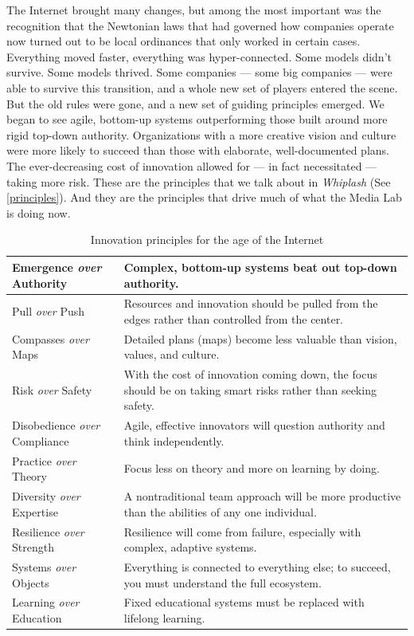 The Internet brought many changes, but among the most important was the recognition that the Newtonian laws that had governed how companies operate now turned out to be local ordinances that only worked in certain cases. Everything moved faster, everything was hyper-connected. Some models didn't survive. Some models thrived. Some companies --- some big companies --- were able to survive this transition, and a whole new set of players entered the scene. But the old rules were gone, and a new set of guiding principles emerged. We began to see agile, bottom-up systems outperforming those built around more rigid top-down authority. Organizations with a more creative vision and culture were more likely to succeed than those with elaborate, well-documented plans. The ever-decreasing cost of innovation allowed for --- in fact necessitated --- taking more risk. These are the principles that we talk about in \emph{Whiplash} (See \autoref{principles}). And they are the principles that drive much of what the Media Lab is doing now.

\begin{table}[H]
\centering
\caption{Innovation principles for the age of the Internet}
\label{principles}
\begin{tabular}{| L{3cm} | L{7cm} |}
\hline
Emergence \textit{over} Authority & Complex, bottom-up systems beat out top-down authority.       \\ \hline
Pull \textit{over} Push  & Resources and innovation should be pulled from the edges rather than controlled from the center.  \\ \hline
Compasses \textit{over} Maps  & Detailed plans (maps) become less valuable than vision, values, and culture.     \\ \hline
Risk \textit{over} Safety  & With the cost of innovation coming down, the focus should be on taking smart risks rather than seeking safety. \\ \hline
Disobedience \textit{over} Compliance & Agile, effective innovators will question authority and think independently.     \\ \hline
Practice \textit{over} Theory  & Focus less on theory and more on learning by doing.        \\ \hline
Diversity \textit{over} Expertise & A nontraditional team approach will be more productive than the abilities of any one individual.  \\ \hline
Resilience \textit{over} Strength & Resilience will come from failure, especially with complex, adaptive systems.    \\ \hline
Systems \textit{over} Objects  & Everything is connected to everything else; to succeed, you must understand the full ecosystem.  \\ \hline
Learning \textit{over} Education & Fixed educational systems must be replaced with lifelong learning.      \\ \hline
\end{tabular}
\end{table}

